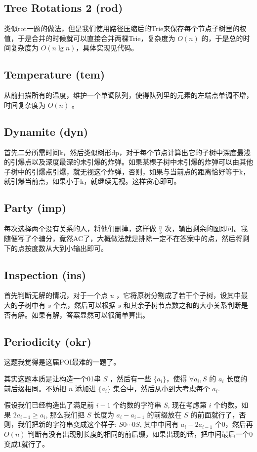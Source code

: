 \documentclass[a4paper,11pt]{article}
\begin{document}
\subsection*{Tree Rotations 2 (rod)}
类似rot一题的做法，但是我们使用路径压缩后的Trie来保存每个节点子树里的权值，于是合并的时候就可以直接合并两棵Trie，复杂度为 $O(n)$ 的，于是总的时间复杂度为 $O(n\lg n)$，具体实现见代码。
\subsection*{Temperature (tem)}
从前扫描所有的温度，维护一个单调队列，使得队列里的元素的左端点单调不增，时间复杂度为 $O(n)$ 。
\subsection*{Dynamite (dyn)}
首先二分所需时间k，然后类似树形dp，对于每个节点计算出它的子树中深度最浅的引爆点以及深度最深的未引爆的炸弹。如果某棵子树中未引爆的炸弹可以由其他子树中的引爆点引爆，就无视这个炸弹，否则，如果与当前点的距离恰好等于k，就引爆当前点，如果小于k，就继续无视。这样贪心即可。
\subsection*{Party (imp)}
每次选择两个没有关系的人，将他们删掉，这样做 $\frac{n}{3}$ 次，输出剩余的图即可。我随便写了个骗分，竟然AC了，大概做法就是排除一定不在答案中的点，然后将剩下的点按度数从大到小输出即可。
\subsection*{Inspection (ins)}
首先判断无解的情况，对于一个点 $u$ ，它将原树分割成了若干个子树，设其中最大的子树中有 $s$ 个点，然后可以根据 $s$ 和其余子树节点数之和的大小关系判断是否有解。如果有解，答案显然可以很简单算出。
\subsection*{Periodicity (okr)}
这题我觉得是这届POI最难的一题了。

其实这题本质是让构造一个01串 $S$ ，然后有一些 $\{a_i\}$，使得 $\forall a_i, S$ 的 $a_i$ 长度的前后缀相同。不妨把 $n$ 添加进 $\{a_i\}$ 集合中，然后从小到大考虑每个 $a_i$.

假设我们已经构造出了满足前 $i-1$ 个约数的字符串 $S$, 现在考虑第 $i$ 个约数。如果 $2a_{i-1} \ge a_i$, 那么我们把 $S$ 长度为 $a_i - a_{i-1}$ 的前缀放在 $S$ 的前面就行了，否则，我们把新的字符串变成这个样子: $S0\cdots0S$, 其中中间有 $a_i - 2a_{i-1}$ 个0，然后再 $O(n)$ 判断有没有出现别长度的相同的前后缀，如果出现的话，把中间最后一个0变成1就行了。
\end{document}
